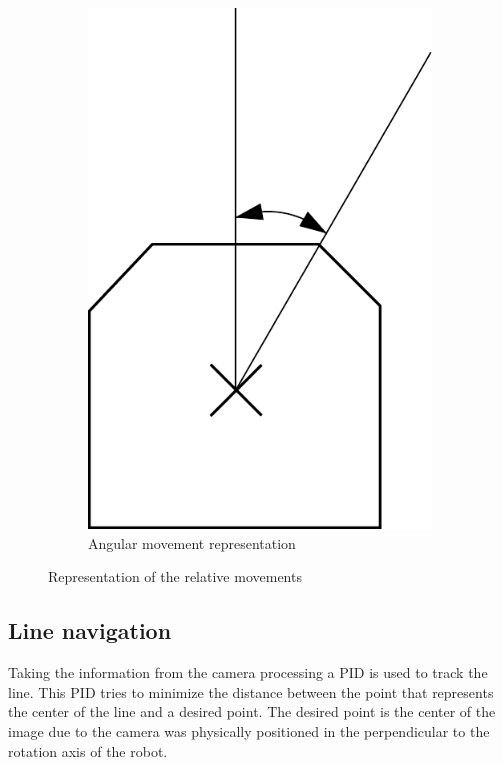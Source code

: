 \begin{figure}
        \hspace{40pt}
        \begin{subfigure}[b]{0.296\textwidth}
            \includegraphics[width=\textwidth]{figs/mr_relative_angular}
            \caption{Angular movement representation}
            \label{fig:mr_relative_angular}
    \end{subfigure}
    \caption{Representation of the relative movements}
    \end{figure}



    \subsection{Line navigation} %
    \label{sub:mr_line_navigation}
    Taking the information from the camera processing a PID is used to track the line.
    This PID tries to minimize the distance between the point that represents the center of the line and a desired point.
    The desired point is the center of the image due to the camera was physically positioned in the perpendicular to the rotation axis of the robot.



